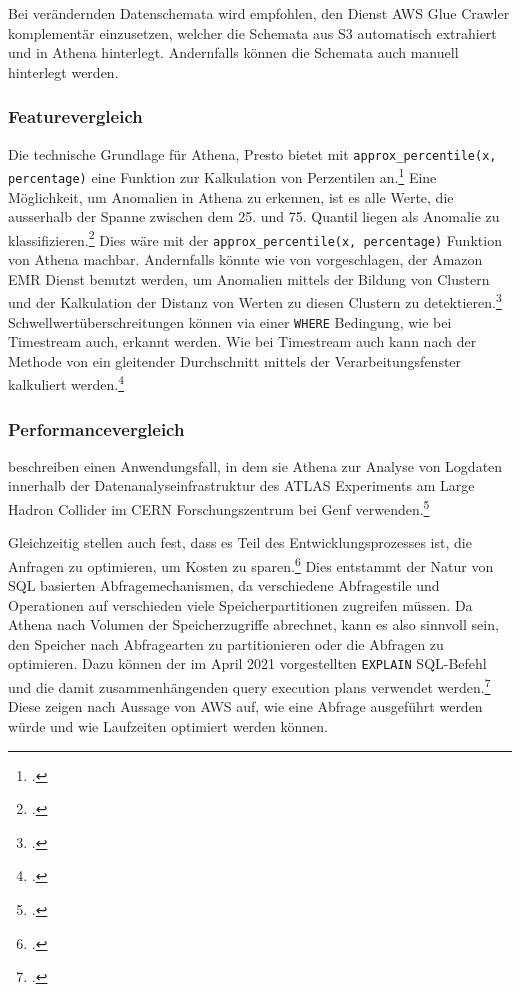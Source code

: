 Bei verändernden Datenschemata wird empfohlen, den Dienst \ac{AWS} Glue Crawler komplementär einzusetzen, welcher die Schemata aus \ac{S3} automatisch extrahiert und in Athena hinterlegt. Andernfalls können die Schemata auch manuell hinterlegt werden.

\subsubsection{Featurevergleich}
Die technische Grundlage für Athena, Presto bietet mit \texttt{approx_percentile(x, percentage)} eine Funktion zur Kalkulation von Perzentilen an.\footcite[Vgl.][]{ThePrestoFoundation.o.J.}
Eine Möglichkeit, um Anomalien in Athena zu erkennen, ist es alle Werte, die ausserhalb der Spanne zwischen dem 25. und 75. Quantil liegen als Anomalie zu klassifizieren.\footcite[Vgl.][]{Salgado.2019} Dies wäre mit der \texttt{approx_percentile(x, percentage)} Funktion von Athena machbar. Andernfalls könnte wie von \citeauthor{Megler.2016} vorgeschlagen, der Amazon \ac{EMR} Dienst benutzt werden, um Anomalien mittels der Bildung von Clustern und der Kalkulation der Distanz von Werten zu diesen Clustern zu detektieren.\footcite[Vgl.][]{Megler.2016}
Schwellwertüberschreitungen können via einer \texttt{WHERE} Bedingung, wie bei Timestream auch, erkannt werden.
Wie bei Timestream auch kann nach der Methode von \citeauthor{Ross.2020} ein gleitender Durchschnitt mittels der Verarbeitungsfenster kalkuliert werden.\footcite[Vgl.][]{Ross.2020}

\subsubsection{Performancevergleich}

\citeauthor{Hartland.2018} beschreiben einen Anwendungsfall, in dem sie Athena zur Analyse von Logdaten innerhalb der Datenanalyseinfrastruktur des ATLAS Experiments am Large Hadron Collider im CERN Forschungszentrum bei Genf verwenden.\footcite[Vgl.][]{Hartland.2018}

Gleichzeitig stellen \citeauthor{Hartland.2018} auch fest, dass es Teil des Entwicklungsprozesses ist, die Anfragen zu  optimieren, um Kosten zu sparen.\footcite[Vgl.][5]{Hartland.2018} Dies entstammt der Natur von \ac{SQL} basierten Abfragemechanismen, da verschiedene Abfragestile und Operationen auf verschieden viele Speicherpartitionen zugreifen müssen. Da Athena nach Volumen der Speicherzugriffe abrechnet, kann es also sinnvoll sein, den Speicher nach Abfragearten zu partitionieren oder die Abfragen zu optimieren. Dazu können der im April 2021 vorgestellten \texttt{EXPLAIN} \ac{SQL}-Befehl und die damit zusammenhängenden query execution plans verwendet werden.\footcite[Vgl. auch im Folgenden][]{AmazonWebServicesInc..2021} Diese zeigen nach Aussage von \ac{AWS} auf, wie eine Abfrage ausgeführt werden würde und wie Laufzeiten optimiert werden können.

